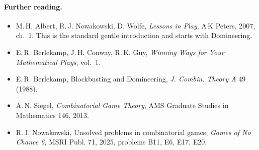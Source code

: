 \documentclass[11pt,a4paper]{article}
\begin{document}
\paragraph{Further reading.}
\begin{itemize}[leftmargin=1.2em]
  \item M.\,H. Albert, R.\,J. Nowakowski, D. Wolfe, \emph{Lessons in Play}, A\,K Peters, 2007,
        ch.~1.  This is the standard gentle introduction and starts with Domineering.
  \item E.\,R. Berlekamp, J.\,H. Conway, R.\,K. Guy, \emph{Winning Ways for Your Mathematical
        Plays}, vol.~1.
  \item E.\,R. Berlekamp, Blockbusting and Domineering, \emph{J. Combin. Theory A} 49 (1988).
  \item A.\,N. Siegel, \emph{Combinatorial Game Theory}, AMS Graduate Studies in Mathematics
        146, 2013.
  \item R.\,J. Nowakowski, Unsolved problems in combinatorial games, \emph{Games of No Chance 6},
        MSRI Publ. 71, 2025, problems B11, E6, E17, E20.
\end{itemize}
\end{document}
